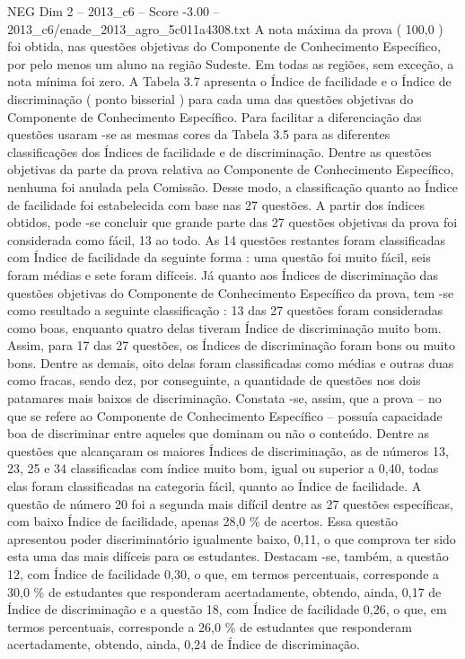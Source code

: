 \begin{textsample}{NEG Dim 2 – 2013\_c6 – Score -3.00 – 2013\_c6/enade\_2013\_agro\_5c011a4308.txt}
A nota máxima da prova ( 100,0 ) foi obtida, nas questões objetivas do Componente de Conhecimento Específico, por pelo menos um aluno na região Sudeste.
Em todas as regiões, sem exceção, a nota mínima foi zero.
A Tabela 3.7 apresenta o Índice de facilidade e o Índice de discriminação ( ponto bisserial ) para cada uma das questões objetivas do Componente de Conhecimento Específico.
Para facilitar a diferenciação das questões usaram -se as mesmas cores da Tabela 3.5 para as diferentes classificações dos Índices de facilidade e de discriminação.
Dentre as questões objetivas da parte da prova relativa ao Componente de Conhecimento Específico, nenhuma foi anulada pela Comissão.
Desse modo, a classificação quanto ao Índice de facilidade foi estabelecida com base nas 27 questões.
A partir dos índices obtidos, pode -se concluir que grande parte das 27 questões objetivas da prova foi considerada como fácil, 13 ao todo.
As 14 questões restantes foram classificadas com Índice de facilidade da seguinte forma : uma questão foi muito fácil, seis foram médias e sete foram difíceis.
Já quanto aos Índices de discriminação das questões objetivas do Componente de Conhecimento Específico da prova, tem -se como resultado a seguinte classificação : 13 das 27 questões foram consideradas como boas, enquanto quatro delas tiveram Índice de discriminação muito bom.
Assim, para 17 das 27 questões, os Índices de discriminação foram bons ou muito bons.
Dentre as demais, oito delas foram classificadas como médias e outras duas como fracas, sendo dez, por conseguinte, a quantidade de questões nos dois patamares mais baixos de discriminação.
Constata -se, assim, que a prova – no que se refere ao Componente de Conhecimento Específico – possuía capacidade boa de discriminar entre aqueles que dominam ou não o conteúdo.
Dentre as questões que alcançaram os maiores Índices de discriminação, as de números 13, 23, 25 e 34 classificadas com índice muito bom, igual ou superior a 0,40, todas elas foram classificadas na categoria fácil, quanto ao Índice de facilidade.
A questão de número 20 foi a segunda mais difícil dentre as 27 questões específicas, com baixo Índice de facilidade, apenas 28,0 \% de acertos.
Essa questão apresentou poder discriminatório igualmente baixo, 0,11, o que comprova ter sido esta uma das mais difíceis para os estudantes.
Destacam -se, também, a questão 12, com Índice de facilidade 0,30, o que, em termos percentuais, corresponde a 30,0 \% de estudantes que responderam acertadamente, obtendo, ainda, 0,17 de Índice de discriminação e a questão 18, com Índice de facilidade 0,26, o que, em termos percentuais, corresponde a 26,0 \% de estudantes que responderam acertadamente, obtendo, ainda, 0,24 de Índice de discriminação.

\end{textsample}

